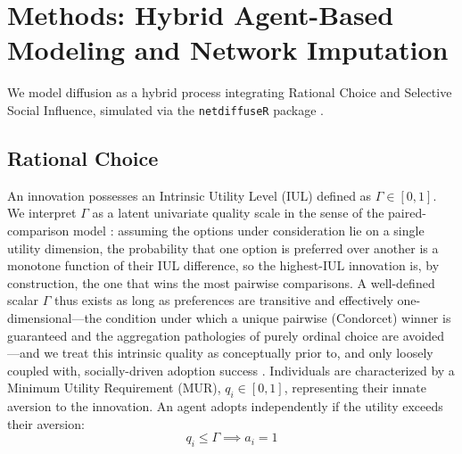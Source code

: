 \documentclass[5p,twocolumn,authoryear]{elsarticle}
\begin{document}
\section{Methods: Hybrid Agent-Based Modeling and Network Imputation}

We model diffusion as a hybrid process integrating Rational Choice and Selective Social Influence, simulated via the \texttt{netdiffuseR} package \citep{netdiffuseR}.

\subsection{Rational Choice}
An innovation possesses an Intrinsic Utility Level (IUL) defined as $\Gamma \in[0, 1]$. We interpret $\Gamma$ as a latent univariate quality scale in the sense of the paired-comparison model \citep{bradley1952}: assuming the options under consideration lie on a single utility dimension, the probability that one option is preferred over another is a monotone function of their IUL difference, so the highest-IUL innovation is, by construction, the one that wins the most pairwise comparisons. A well-defined scalar $\Gamma$ thus exists as long as preferences are transitive and effectively one-dimensional---the condition under which a unique pairwise (Condorcet) winner is guaranteed and the aggregation pathologies of purely ordinal choice are avoided \citep{arrow1951}---and we treat this intrinsic quality as conceptually prior to, and only loosely coupled with, socially-driven adoption success \citep{salganik2006}. Individuals are characterized by a Minimum Utility Requirement (MUR), $q_i \in[0,1]$, representing their innate aversion to the innovation. An agent adopts independently if the utility exceeds their aversion:
\begin{equation}
    q_i \le \Gamma \implies a_i = 1
\end{equation}
\end{document}
